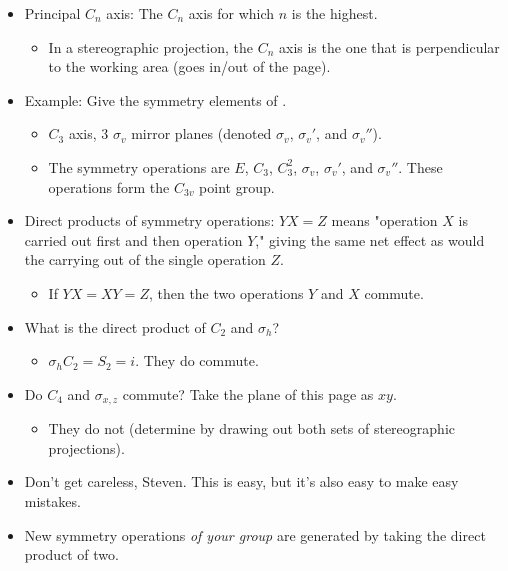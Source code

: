 \documentclass[../notes.tex]{subfiles}
\begin{document}
\begin{itemize}
\begin{figure}[h!]
        \label{fig:stereographicElem}
    \end{figure}
    \item Principal $C_n$ axis: The $C_n$ axis for which $n$ is the highest.
    \begin{itemize}
        \item In a stereographic projection, the $C_n$ axis is the one that is perpendicular to the working area (goes in/out of the page).
    \end{itemize}
    \item Example: Give the symmetry elements of .
    \begin{itemize}
        \item $C_3$ axis, 3 $\sigma_v$ mirror planes (denoted $\sigma_v$, $\sigma_v'$, and $\sigma_v''$).
        \item The symmetry operations are $E$, $C_3$, $C_3^2$, $\sigma_v$, $\sigma_v'$, and $\sigma_v''$. These operations form the $C_{3v}$ point group.
    \end{itemize}
    \item Direct products of symmetry operations: $YX=Z$ means "operation $X$ is carried out first and then operation $Y$," giving the same net effect as would the carrying out of the single operation $Z$.
    \begin{itemize}
        \item If $YX=XY=Z$, then the two operations $Y$ and $X$ commute.
    \end{itemize}
    \item What is the direct product of $C_2$ and $\sigma_h$?
    \begin{itemize}
        \item $\sigma_hC_2=S_2=i$. They do commute.
    \end{itemize}
    \item Do $C_4$ and $\sigma_{x,z}$ commute? Take the plane of this page as $xy$.
    \begin{itemize}
        \item They do not (determine by drawing out both sets of stereographic projections).
    \end{itemize}
    \item Don't get careless, Steven. This is easy, but it's also easy to make easy mistakes.
    \item New symmetry operations \emph{of your group} are generated by taking the direct product of two.
\end{itemize}
\end{document}
